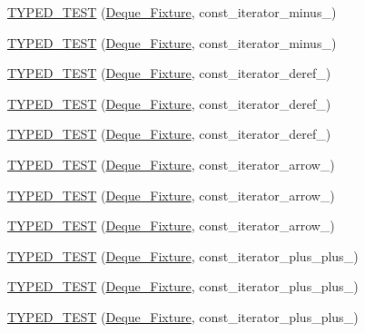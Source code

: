 \begin{DoxyCompactItemize}
\item 
\hyperlink{TestDeque_8c_09_09_a5ef97bba1bfe9ab454df3031f7bc8a4d}{T\-Y\-P\-E\-D\-\_\-\-T\-E\-S\-T} (\hyperlink{structDeque__Fixture}{Deque\-\_\-\-Fixture}, const\-\_\-iterator\-\_\-minus\-\_)
\item 
\hyperlink{TestDeque_8c_09_09_a4ff51589b425bbca0a73ac8e46b8896a}{T\-Y\-P\-E\-D\-\_\-\-T\-E\-S\-T} (\hyperlink{structDeque__Fixture}{Deque\-\_\-\-Fixture}, const\-\_\-iterator\-\_\-minus\-\_)
\item 
\hyperlink{TestDeque_8c_09_09_a0366c77ac8c3fa6e79385d247fbaf36e}{T\-Y\-P\-E\-D\-\_\-\-T\-E\-S\-T} (\hyperlink{structDeque__Fixture}{Deque\-\_\-\-Fixture}, const\-\_\-iterator\-\_\-deref\-\_)
\item 
\hyperlink{TestDeque_8c_09_09_ae751c8b45c6214e8ab58ed5c9dec0f6c}{T\-Y\-P\-E\-D\-\_\-\-T\-E\-S\-T} (\hyperlink{structDeque__Fixture}{Deque\-\_\-\-Fixture}, const\-\_\-iterator\-\_\-deref\-\_)
\item 
\hyperlink{TestDeque_8c_09_09_a3c04ae1e1ebe70efda2bc8bfe5594819}{T\-Y\-P\-E\-D\-\_\-\-T\-E\-S\-T} (\hyperlink{structDeque__Fixture}{Deque\-\_\-\-Fixture}, const\-\_\-iterator\-\_\-deref\-\_)
\item 
\hyperlink{TestDeque_8c_09_09_a8ef35ade3c68ef1fefd197a56bd89a5a}{T\-Y\-P\-E\-D\-\_\-\-T\-E\-S\-T} (\hyperlink{structDeque__Fixture}{Deque\-\_\-\-Fixture}, const\-\_\-iterator\-\_\-arrow\-\_)
\item 
\hyperlink{TestDeque_8c_09_09_ac6d240f4325ccba620d163463facd959}{T\-Y\-P\-E\-D\-\_\-\-T\-E\-S\-T} (\hyperlink{structDeque__Fixture}{Deque\-\_\-\-Fixture}, const\-\_\-iterator\-\_\-arrow\-\_)
\item 
\hyperlink{TestDeque_8c_09_09_a77f941e113d0c06105cc827799220309}{T\-Y\-P\-E\-D\-\_\-\-T\-E\-S\-T} (\hyperlink{structDeque__Fixture}{Deque\-\_\-\-Fixture}, const\-\_\-iterator\-\_\-arrow\-\_)
\item 
\hyperlink{TestDeque_8c_09_09_a9b2807cf74c6dd5106ae758c160bd12a}{T\-Y\-P\-E\-D\-\_\-\-T\-E\-S\-T} (\hyperlink{structDeque__Fixture}{Deque\-\_\-\-Fixture}, const\-\_\-iterator\-\_\-plus\-\_\-plus\-\_)
\item 
\hyperlink{TestDeque_8c_09_09_a1010257879ae24ba2024cfc87b018d60}{T\-Y\-P\-E\-D\-\_\-\-T\-E\-S\-T} (\hyperlink{structDeque__Fixture}{Deque\-\_\-\-Fixture}, const\-\_\-iterator\-\_\-plus\-\_\-plus\-\_)
\item 
\hyperlink{TestDeque_8c_09_09_a4a1d82187c5ebe174ab8a23ef0ad94e0}{T\-Y\-P\-E\-D\-\_\-\-T\-E\-S\-T} (\hyperlink{structDeque__Fixture}{Deque\-\_\-\-Fixture}, const\-\_\-iterator\-\_\-plus\-\_\-plus\-\_)

\end{DoxyCompactItemize}
